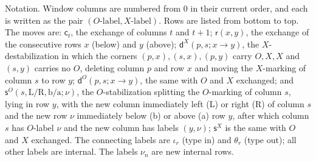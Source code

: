 \documentclass[11pt]{amsart}
\theoremstyle{definition}
\theoremstyle{remark}
\begin{document}
Notation. Window columns are numbered from $0$ in their current order, and each is written as the pair
$(O\text{-label},X\text{-label})$. Rows are listed from bottom to top. The moves are:
$\mathsf c_t$, the exchange of columns $t$ and $t+1$; $\mathsf r(x,y)$, the exchange of the consecutive
rows $x$ (below) and $y$ (above); $\mathsf d^{X}(p,s;x\to y)$, the $X$-destabilization in which the
corners $(p,x),(s,x),(p,y)$ carry $O,X,X$ and $(s,y)$ carries no $O$, deleting column $p$ and row $x$
and moving the $X$-marking of column $s$ to row $y$; $\mathsf d^{O}(p,s;x\to y)$, the same with $O$ and
$X$ exchanged; and $\mathsf s^{O}(s,\mathrm{L/R},\mathrm{b/a};\nu)$, the $O$-stabilization splitting the
$O$-marking of column $s$, lying in row $y$, with the new column immediately left (L) or right (R) of
column $s$ and the new row $\nu$ immediately below (b) or above (a) row $y$, after which column $s$ has
$O$-label $\nu$ and the new column has labels $(y,\nu)$; $\mathsf s^{X}$ is the same with $O$ and $X$
exchanged. The connecting labels are $\iota_r$ (type in) and $\theta_r$ (type out); all other labels are
internal. The labels $\nu_n$ are new internal rows.
\end{document}
